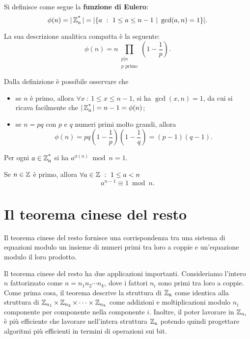 \begin{definizione}
Si definisce come segue la \textbf{funzione di Eulero}:
\[
\phi (n) = |\Zns|=|\{a \ :\ 1\leq a\leq n-1 \ | \ \gcd(a,n)=1\}|.
\]

La sua descrizione analitica compatta è la seguente:
\[
\phi (n) = n\prod_{\substack{p|n \\ p \text{ primo}}} \left(1-\frac{1}{p}\right).
\]
\end{definizione}

Dalla definizione è possibile osservare che
\begin{itemize}
\item se $n$ è primo, allora $\forall x \ : \ 1\leq x \leq n-1$, si ha $\gcd(x,n)=1$, da cui si ricava facilmente che $|\operatorname*{\mathbb{Z}_n^*}|=n-1=\phi (n)$;
\item se $n=pq$ con $p$ e $q$ numeri primi molto grandi, allora
\[
\phi (n)=pq\left(1-\frac{1}{p}\right)\left(1-\frac{1}{q}\right)=(p-1)(q-1).
\]
\end{itemize}

\begin{teorema}
Per ogni $a\in\operatorname*{\mathbb{Z}_n^*}$ si ha $a^{\phi (n)} \bmod n = 1$.
\end{teorema}

\begin{corollario}
Se $n\in\operatorname*{\mathbb{Z}}$ è primo, allora $\forall a\in\operatorname*{\mathbb{Z}}\ :\ 1\leq a < n$
\[
a^{n-1} \equiv 1\bmod n.
\]
\end{corollario}

\section{Il teorema cinese del resto}
Il teorema cinese del resto fornisce una corrispondenza tra una sistema di equazioni modulo un insieme di numeri primi tra loro a coppie e un'equazione modulo il loro prodotto.

Il teorema cinese del resto ha due applicazioni importanti. Consideriamo l'intero $n$ fattorizzato come $n=n_1n_2\cdots n_k$, dove i fattori $n_i$ sono primi tra loro a coppie. Come prima cosa, il teorema descrive la struttura di $\operatorname*{\mathbb{Z}_n}$ come identica alla struttura di $\operatorname*{\mathbb{Z}}_{n_1} \times \operatorname*{\mathbb{Z}}_{n_2} \times \cdots \times \operatorname*{\mathbb{Z}}_{n_k}$ come addizioni e moltiplicazioni modulo $n_i$ componente per componente nella componente $i$. Inoltre, il poter lavorare in $\operatorname*{\mathbb{Z}}_{n_i}$ è più efficiente che lavorare nell'intera struttura $\operatorname*{\mathbb{Z}_n}$ potendo quindi progettare algoritmi più efficienti in termini di operazioni sui bit.

